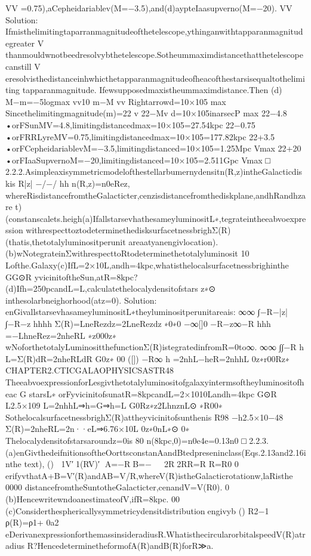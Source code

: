 VV
=0.75),aCepheidariablev(M=−3.5),and(d)aypteIaasupverno(M=−20).
VV
Solution:
Ifmisthelimitingtaparranmagnitudeofthetelescope,ythinganwithtapparanmagnitudegreater
V
thanmouldwnotbeedresolvybthetelescope.Sotheummaximdistancethatthetelescopecanstill
V
eresolvisthedistanceinhwhicthetapparanmagnitudeofheacofthestarsisequaltothelimiting
tapparanmagnitude.
Ifewsupposedmaxistheummaximdistance.Then
(d)
M−m=−5logmax
vv10
m−M
vv
Rightarrowd=10×105
max
Sincethelimitingmagnitude(m)=22
v
22−Mv
d=10×105inarsecP
max
22−4.8
•orFSunMV=4.8,limitingdistancedmax=10×105=27.54kpc
22−0.75
•orFRRLyreMV=0.75,limitingdistancedmax=10×105=177.82kpc
22+3.5
•orFCepheidariablevM=−3.5,limitingdistanced=10×105=1.25Mpc
Vmax
22+20
•orFIaaSupvernoM=−20,limitingdistanced=10×105=2.511Gpc
Vmax
□
2.2.2.Asimpleaxisymmetricmodelofthestellarbumernydensitn(R,z)intheGalacticdiskis
R|z|
−/−/
hh
n(R,z)=n0eRez,
whereRisdistancefromtheGalacticter,cenzisdistancefromthediskplane,andhRandhzare
t)(constanscalets.heigh(a)IfallstarsevhathesameyluminositL∗,tegrateintheeabvoexpression
withrespecttoztodeterminethedisksurfacetnessbrighΣ(R)(thatis,thetotalyluminositperunit
areaatyanengivlocation).(b)wNotegrateinΣwithrespecttoRtodeterminethetotalyluminosit
10
Lofthe.Galaxy(c)IfL=2×10L,andh=4kpc,whatisthelocalsurfacetnessbrighinthe
GG⊙R
yvicinitoftheSun,atR=8kpc?(d)Ifh=250pcandL=L,calculatethelocalydensitofstars
z∗⊙
inthesolarbneighorhood(atz=0).
Solution:
enGivallstarsevhasameyluminositL∗theyluminositperunitareais:
∞∞
∫−R−|z|∫−R−z
hhhh
Σ(R)=LneRezdz=2LneRezdz
∗0∗0
−∞[]0
−R−z∞−R
hhh
=−LhneRez=2nheRL
∗z000z∗
wNoforthetotalyLuminositthefunctionΣ(R)istegratedinfromR=0to∞.
∞∞
∫∫−R
h
L=Σ(R)dR=2nheRLdR
G0z∗
00
([])
−R∞
h
=2nhL−heR=2nhhL
0z∗r00Rz∗
CHAPTER2.CTICGALAOPHYSICSASTR48
TheeabvoexpressionforLesgivthetotalyluminositofgalaxyintermsoftheyluminositofheac
G
starsL∗
orFyvicinitofsunatR=8kpcandL=2×1010Landh=4kpc
G⊙R
L2.5×109
L=2nhhL⇒h=G⇒h=L
G0Rz∗z2LhnznL⊙
∗R00∗
SothelocalsurfacetnessbrighΣ(R)attheyvicinitofsunthenis
R98
−h2.5×10−48
Σ(R)=2nheRL=2n··eL⇒6.76×10L
0z∗0nL∗⊙
0∗
Thelocalydensitofstarsaroundz=0is
80
n(8kpc,0)=n0e4e=0.13n0
□
2.2.3.(a)enGivthedeifnitionsoftheOorttsconstanAandBtedpreseninclass(Eqs.2.13and2.16inthe
text),
()
1V′1(RV)′
A=−RB=−

2R2RR=R
R=R0
0
erifyvthatA+B=V′(R)andAB=V/R,whereV(R)istheGalacticrotationw,laRisthe
0000
distancefromtheSuntotheGalacticter,cenandV=V(R0).
0
(b)HencewritewndoanestimateofV,ifR=8kpc.
00
(c)Considerthesphericallysymmetricydensitdistribution￿engivyb
()
R2−1
ρ(R)=ρ1+
0a2
eDerivanexpressionforthemassinsideradiusR.WhatisthecircularorbitalspeedV(R)atradius
R?HencedeterminetheformofA(R)andB(R)forR≫a.
